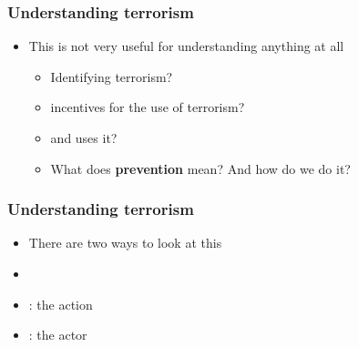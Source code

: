 \documentclass[aspectratio=43]{beamer}
\begin{document}
\begin{frame}
\frametitle{Understanding terrorism}
\centering

\begin{itemize}
  \item[] This is not very useful for understanding anything at all
  \begin{itemize}
    \item<2-> Identifying terrorism?
    \item<3->  incentives for the use of terrorism?
    \item<4-> {\color{red}{Who}} and {\color{red}{when}} uses it?
    \item<5-> What does \textbf{prevention} mean? And how do we do it?
  \end{itemize}
\end{itemize}

\end{frame}

\begin{frame}
\frametitle{Understanding terrorism}
\centering

\begin{itemize}
  \item[] There are two ways to look at this
  \item[]
  \item<2-> : the action
  \item<2-> : the actor
\end{itemize}

\end{frame}
\end{document}
